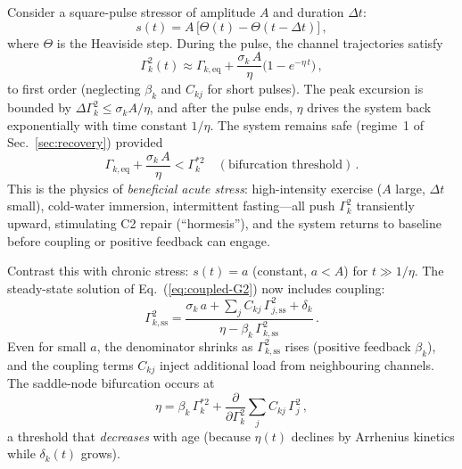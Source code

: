 \documentclass[aps,pre,twocolumn,superscriptaddress,floatfix]{revtex4-2}
\begin{document}
Consider a square-pulse stressor of amplitude $A$
and duration $\Delta t$:
\begin{equation}
  s(t) = A\,\bigl[\Theta(t) - \Theta(t - \Delta t)\bigr]\,,
  \label{eq:pulse-stress}
\end{equation}
where $\Theta$ is the Heaviside step.
During the pulse, the channel trajectories satisfy
\begin{equation}
  \Gamma_k^2(t) \approx \Gamma_{k,\text{eq}}
  + \frac{\sigma_k\,A}{\eta}
    \bigl(1 - e^{-\eta\,t}\bigr)\,,
  \label{eq:acute-response}
\end{equation}
to first order (neglecting $\beta_k$ and $C_{kj}$
for short pulses).
The peak excursion is bounded by
$\Delta\Gamma_k^2 \leq \sigma_k A / \eta$,
and after the pulse ends, $\eta$ drives the system
back exponentially with time constant $1/\eta$.
The system remains safe (regime~1 of
Sec.~\ref{sec:recovery}) provided
\begin{equation}
  \Gamma_{k,\text{eq}} + \frac{\sigma_k\,A}{\eta}
  < \Gamma_k^{*2}
  \quad (\text{bifurcation threshold})\,.
  \label{eq:safe-acute}
\end{equation}
This is the physics of \emph{beneficial acute stress}:
high-intensity exercise ($A$ large, $\Delta t$ small),
cold-water immersion, intermittent fasting---all push
$\Gamma_k^2$ transiently upward, stimulating C2 repair
(``hormesis''), and the system returns to baseline
before coupling or positive feedback can engage.

Contrast this with chronic stress:
$s(t) = a$ (constant, $a < A$) for $t \gg 1/\eta$.
The steady-state solution of
Eq.~(\ref{eq:coupled-G2}) now includes coupling:
\begin{equation}
  \Gamma_{k,\text{ss}}^2
  = \frac{\sigma_k\,a + \sum_j C_{kj}\,\Gamma_{j,\text{ss}}^2
         + \delta_k}
        {\eta - \beta_k\,\Gamma_{k,\text{ss}}^2}\,.
  \label{eq:chronic-ss}
\end{equation}
Even for small $a$, the denominator shrinks as
$\Gamma_{k,\text{ss}}^2$ rises
(positive feedback $\beta_k$), and the coupling
terms $C_{kj}$ inject additional load from
neighbouring channels.
The saddle-node bifurcation occurs at
\begin{equation}
  \eta = \beta_k\,\Gamma_k^{*2}
         + \frac{\partial}{\partial\Gamma_k^2}
           \sum_j C_{kj}\,\Gamma_j^2\,,
  \label{eq:chronic-bifurcation}
\end{equation}
a threshold that \emph{decreases} with age
(because $\eta(t)$ declines by Arrhenius kinetics
while $\delta_k(t)$ grows).
\end{document}
